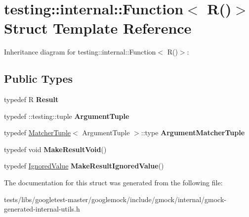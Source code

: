 \hypertarget{structtesting_1_1internal_1_1Function_3_01R_07_08_4}{}\section{testing\+:\+:internal\+:\+:Function$<$ R()$>$ Struct Template Reference}
\label{structtesting_1_1internal_1_1Function_3_01R_07_08_4}


Inheritance diagram for testing\+:\+:internal\+:\+:Function$<$ R()$>$\+:
\subsection*{Public Types}
\begin{DoxyCompactItemize}
\item 
\mbox{\label{structtesting_1_1internal_1_1Function_3_01R_07_08_4_a5c228a886ef598ac10988f8de5e32ca1}} 
typedef R {\bfseries Result}
\item 
\mbox{\label{structtesting_1_1internal_1_1Function_3_01R_07_08_4_ad483c3128c470d8cdb55c3ac1c575c11}} 
typedef \+::testing\+::tuple {\bfseries Argument\+Tuple}
\item 
\mbox{\label{structtesting_1_1internal_1_1Function_3_01R_07_08_4_a9bec5cf8937e8af99dedab2f40129fab}} 
typedef \hyperlink{structtesting_1_1internal_1_1MatcherTuple}{Matcher\+Tuple}$<$ Argument\+Tuple $>$\+::type {\bfseries Argument\+Matcher\+Tuple}
\item 
\mbox{\label{structtesting_1_1internal_1_1Function_3_01R_07_08_4_a666b5ad3bf155529d3a0f9fe6d5c897b}} 
typedef void {\bfseries Make\+Result\+Void}()
\item 
\mbox{\label{structtesting_1_1internal_1_1Function_3_01R_07_08_4_aa459093a5b52ef54e2544b5a6c054383}} 
typedef \hyperlink{classtesting_1_1internal_1_1IgnoredValue}{Ignored\+Value} {\bfseries Make\+Result\+Ignored\+Value}()
\end{DoxyCompactItemize}


The documentation for this struct was generated from the following file\+:\begin{DoxyCompactItemize}
\item 
tests/libs/googletest-\/master/googlemock/include/gmock/internal/gmock-\/generated-\/internal-\/utils.\+h\end{DoxyCompactItemize}
